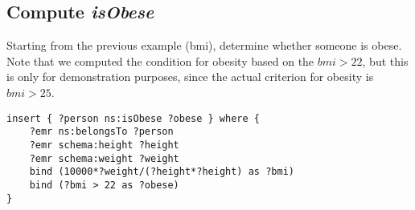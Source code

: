 \documentclass[12pt]{article}
\begin{document}
\subsection{Compute \textit{isObese}}
Starting from the previous example (\gls{bmi}), determine whether someone is obese. Note that we computed the condition for obesity based on the \(bmi > 22\), but this is only for demonstration purposes, since the actual criterion for obesity is \(bmi > 25\).
\begin{verbatim}   
insert { ?person ns:isObese ?obese } where {
    ?emr ns:belongsTo ?person
    ?emr schema:height ?height
    ?emr schema:weight ?weight
    bind (10000*?weight/(?height*?height) as ?bmi)
    bind (?bmi > 22 as ?obese)
}
\end{verbatim}
  
\end{document}
